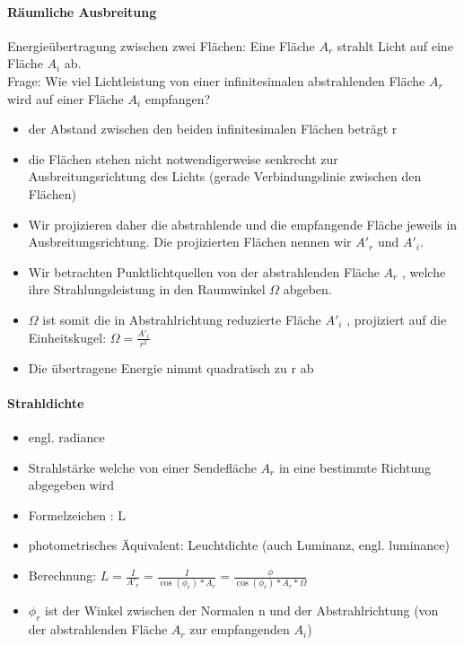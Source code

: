 \documentclass[10pt,landscape]{article}
\begin{document}
\begin{multicols}{3}
  \paragraph{Räumliche Ausbreitung}
  Energieübertragung zwischen zwei Flächen:
  Eine Fläche $A_r$ strahlt Licht auf eine Fläche $A_i$ ab.\\
  Frage: Wie viel Lichtleistung von einer infinitesimalen abstrahlenden Fläche $A_r$ wird auf einer Fläche $A_i$ empfangen?
  \begin{itemize}
    \item der Abstand zwischen den beiden infinitesimalen Flächen beträgt r
    \item die Flächen stehen nicht notwendigerweise senkrecht zur Ausbreitungsrichtung des Lichts (gerade Verbindungslinie zwischen den Flächen)
    \item Wir projizieren daher die abstrahlende und die empfangende Fläche jeweils in Ausbreitungsrichtung. Die projizierten Flächen nennen wir $A'_r$ und $A'_i$.
    \item Wir betrachten Punktlichtquellen von der abstrahlenden Fläche $A_r$ , welche ihre Strahlungsleistung in den Raumwinkel $\Omega$ abgeben.
    \item $\Omega$ ist somit die in Abstrahlrichtung reduzierte Fläche $A'_i$ , projiziert auf die Einheitskugel: $\Omega=\frac{A'_i}{r^2}$
    \item Die übertragene Energie nimmt quadratisch zu r ab
  \end{itemize}
  
  \paragraph{Strahldichte}
  \begin{itemize}
    \item engl. radiance
    \item Strahlstärke welche von einer Sendefläche $A_r$ in eine bestimmte Richtung abgegeben wird
    \item Formelzeichen : L
    \item photometrisches Äquivalent: Leuchtdichte (auch Luminanz, engl. luminance)
    \item Berechnung: $L = \frac{I}{A'_r}=\frac{I}{\cos(\phi_r)*A_r} = \frac{\phi}{\cos(\phi_r)*A_r*\Omega}$
    \item $\phi_r$ ist der Winkel zwischen der Normalen n und der Abstrahlrichtung (von der abstrahlenden Fläche $A_r$ zur empfangenden $A_i$)
  \end{itemize}
  

\end{multicols}
\end{document}
